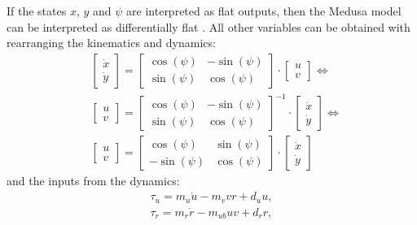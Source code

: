 \par If the states $x$, $y$ and $\psi$ are interpreted as flat outputs, then the Medusa model can be interpreted as differentially flat \cite{privateconversationprimitive}. All other variables can be obtained with rearranging the kinematics and dynamics:
\begin{equation}
\begin{split}
    & \begin{bmatrix}
        \dot{x} \\ \dot{y}
    \end{bmatrix} = 
    \begin{bmatrix}
        \cos(\psi) & - \sin(\psi) \\
        \sin(\psi) & \cos(\psi)
    \end{bmatrix} \cdot
    \begin{bmatrix}
        u \\ v
    \end{bmatrix} \Leftrightarrow  \\
    & \begin{bmatrix}
        u \\ v
    \end{bmatrix} = 
    \begin{bmatrix}
        \cos(\psi) & - \sin(\psi) \\
        \sin(\psi) & \cos(\psi)
    \end{bmatrix}^{-1} \cdot
    \begin{bmatrix}
        \dot{x} \\ \dot{y}
    \end{bmatrix} \Leftrightarrow \\
    & \begin{bmatrix}
        u \\ v
    \end{bmatrix} = 
    \begin{bmatrix}
        \cos(\psi) & \sin(\psi) \\
        - \sin(\psi) & \cos(\psi)
    \end{bmatrix} \cdot
    \begin{bmatrix}
        \dot{x} \\ \dot{y}
    \end{bmatrix}
\end{split}
\end{equation}
and the  inputs from the dynamics:
\begin{equation} 
    \begin{gathered}
        \tau_u = m_u\dot{u} - m_v v r + d_u u , \\
        \tau_r = m_r \dot{r} - m_{ub} u v + d_r r ,
    \end{gathered}
    \label{eq:rearaged_dynamics}
\end{equation}
 
